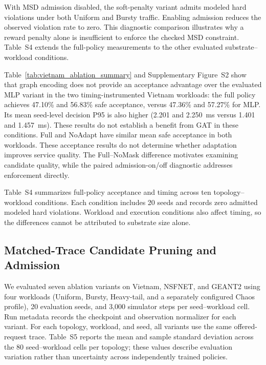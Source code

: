 \documentclass[final,5p]{elsarticle}
\newcommand{\rev}[1]{\textcolor{revisiongreen}{#1}}
\let\newrev\rev
\begin{document}
\newrev{With MSD admission disabled, the soft-penalty variant admits modeled hard violations under both Uniform and Bursty traffic. Enabling admission reduces the observed violation rate to zero. This diagnostic comparison illustrates why a reward penalty alone is insufficient to enforce the checked MSD constraint. Table~S4 extends the full-policy measurements to the other evaluated substrate--workload conditions.}

\newrev{Table~\ref{tab:vietnam_ablation_summary} and Supplementary Figure~S2 show that graph encoding does not provide an acceptance advantage over the evaluated MLP variant in the two timing-instrumented Vietnam workloads: the full policy achieves 47.10\% and 56.83\% safe acceptance, versus 47.36\% and 57.27\% for MLP. Its mean seed-level decision P95 is also higher (2.201 and 2.250~ms versus 1.401 and 1.457~ms). These results do not establish a benefit from GAT in these conditions. Full and NoAdapt have similar mean safe acceptance in both workloads. These acceptance results do not determine whether adaptation improves service quality. The Full--NoMask difference motivates examining candidate quality, while the paired admission-on/off diagnostic addresses enforcement directly.}



\newrev{Table~S4 summarizes full-policy acceptance and timing across ten topology--workload conditions. Each condition includes 20 seeds and records zero admitted modeled hard violations. Workload and execution conditions also affect timing, so the differences cannot be attributed to substrate size alone.}



\subsection{\newrev{Matched-Trace Candidate Pruning and Admission}}
\label{subsec:mask_admission}
\newrev{We evaluated seven ablation variants on Vietnam, NSFNET, and GEANT2 using four workloads (Uniform, Bursty, Heavy-tail, and a separately configured Chaos profile), 20 evaluation seeds, and 3,000 simulator steps per seed--workload cell. Run metadata records the checkpoint and observation normalizer for each variant. For each topology, workload, and seed, all variants use the same offered-request trace. Table~S5 reports the mean and sample standard deviation across the 80 seed--workload cells per topology; these values describe evaluation variation rather than uncertainty across independently trained policies.}
\end{document}
